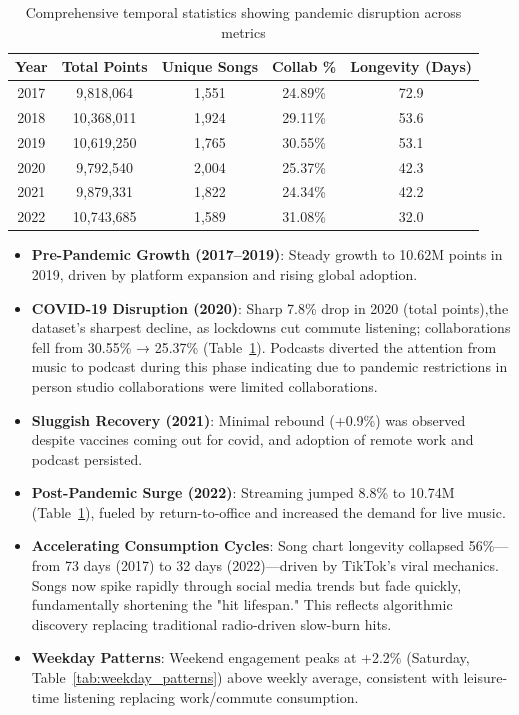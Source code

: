 \documentclass{article}
\begin{document}
\begin{table}[h]
\begin{tabular}{|c|c|c|c|c|}
\hline
\textbf{Year} & \textbf{Total Points} & \textbf{Unique Songs} & \textbf{Collab \%} & \textbf{Longevity (Days)} \\ \hline
2017 & 9,818,064 & 1,551 & 24.89\% & 72.9 \\ \hline
2018 & 10,368,011 & 1,924 & 29.11\% & 53.6 \\ \hline
2019 & 10,619,250 & 1,765 & 30.55\% & 53.1 \\ \hline
2020 & 9,792,540 & 2,004 & 25.37\% & 42.3 \\ \hline
2021 & 9,879,331 & 1,822 & 24.34\% & 42.2 \\ \hline
2022 & 10,743,685 & 1,589 & 31.08\% & 32.0 \\ \hline
\end{tabular}
\centering
\vspace{0.3cm}
\caption{Comprehensive temporal statistics showing pandemic disruption across metrics}
\label{tab:temporal_stats}
\end{table}




\begin{itemize}
    \item \textbf{Pre-Pandemic Growth (2017–2019)}: Steady growth to 10.62M points in 2019, driven by platform expansion and rising global adoption.\cite{hansen2022musicspending}
    \item \textbf{COVID-19 Disruption (2020)}: Sharp 7.8\% drop in 2020 (total points),the dataset's sharpest decline, as lockdowns cut commute listening\cite{aguiar2021covid}; collaborations fell from 30.55\% → 25.37\% (Table~\ref{tab:temporal_stats}). Podcasts diverted the attention from music to podcast during this phase indicating due to pandemic restrictions in person studio collaborations were limited collaborations.\cite{spotify_podcast_expansion_2020}
    \item \textbf{Sluggish Recovery (2021)}: Minimal rebound (+0.9\%) was observed despite vaccines coming out for covid, and adoption of remote work and podcast persisted.\cite{ye2022variety}
    \item \textbf{Post-Pandemic Surge (2022)}: Streaming jumped 8.8\% to 10.74M (Table~\ref{tab:temporal_stats}), fueled by return-to-office and increased the  demand for live music.\cite{hansen2022musicspending}
    \item \textbf{Accelerating Consumption Cycles}: Song chart longevity collapsed 56\%—from 73 days (2017) to 32 days (2022)—driven by TikTok's viral mechanics. Songs now spike rapidly through social media trends but fade quickly, fundamentally shortening the "hit lifespan." This reflects algorithmic discovery replacing traditional radio-driven slow-burn hits.\cite{ye2022variety}
    \item \textbf{Weekday Patterns}: Weekend engagement peaks at +2.2\% (Saturday, Table~\ref{tab:weekday_patterns}) above weekly average, consistent with leisure-time listening replacing work/commute consumption.\cite{krause2022covidlistening}
\end{itemize}
\end{document}
